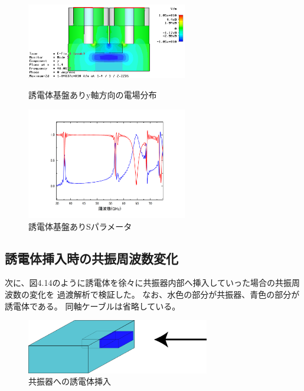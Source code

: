 \begin{figure}[h]
 \begin{minipage}{0.5\hsize}
  \begin{center}
   \includegraphics[width=70mm]{./image/model73_y_x.png}
  \end{center}
  \caption{誘電体基盤ありy軸方向の電場分布}
  \label{fig:one}
 \end{minipage}
 \begin{minipage}{0.5\hsize}
  \begin{center}
   \includegraphics[width=70mm]{./image/Graph4.jpg}
  \end{center}
  \caption{誘電体基盤ありSパラメータ}
  \label{fig:two}
 \end{minipage}
\end{figure}

\subsection*{誘電体挿入時の共振周波数変化}
次に、図4.14のように誘電体を徐々に共振器内部へ挿入していった場合の共振周波数の変化を
過渡解析で検証した。
なお、水色の部分が共振器、青色の部分が誘電体である。
同軸ケーブルは省略している。
\vspace{10 mm}

\begin{figure}[h]
  \begin{center}
    \includegraphics[width=8cm]{./image/insert.png}
    \caption{共振器への誘電体挿入}
    \label{fig:insert}
  \end{center}
\end{figure}

